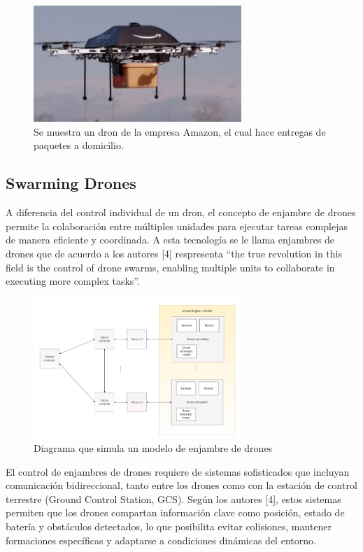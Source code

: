 \begin{figure}
    \centering
    \includegraphics[width=0.7\textwidth]{pictures/drone_aplication_2.jpg}
    \caption{Se muestra un dron de la empresa Amazon, el cual hace entregas de paquetes a domicilio. \cite{aplications_drones}}
    \label{fig:drone_applications_2}
\end{figure}

\subsection{Swarming Drones}
A diferencia del control individual de un dron, el concepto de enjambre de drones permite la colaboración entre múltiples unidades para ejecutar tareas complejas de manera eficiente y coordinada. A esta tecnología se le llama enjambres de drones que de acuerdo a los autores [4] respresenta “the true revolution in this field is the control of drone swarms, enabling multiple units to collaborate in executing more complex tasks”. 

\begin{figure}
    \centering
    \includegraphics[width=0.7\textwidth]{pictures/swarm_diagram.png}
    \caption{Diagrama que simula un modelo de enjambre de drones}
    \label{fig:swarming_drones}
\end{figure}

El control de enjambres de drones requiere de sistemas sofisticados que incluyan comunicación bidireccional, tanto entre los drones como con la estación de control terrestre (Ground Control Station, GCS). Según los autores [4], estos sistemas permiten que los drones compartan información clave como posición, estado de batería y obstáculos detectados, lo que posibilita evitar colisiones, mantener formaciones específicas y adaptarse a condiciones dinámicas del entorno.

